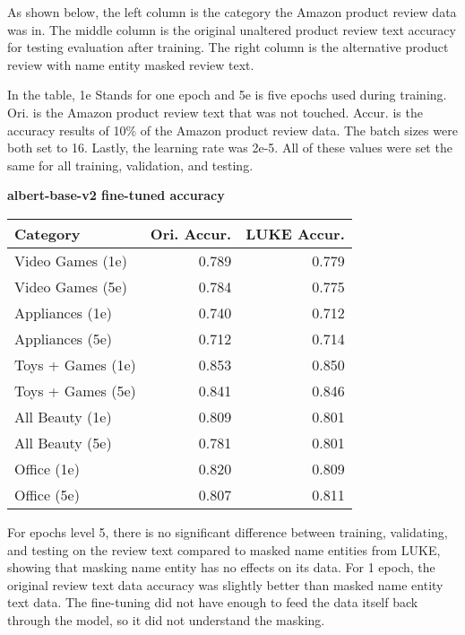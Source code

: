 \documentclass[11pt,a4paper]{article}
\begin{document}
As shown below, the left column is the category the Amazon product review data was in. The middle column is the original unaltered product review text accuracy for testing evaluation after training. The right column is the alternative product review with name entity masked review text.

In the table, 1e Stands for one epoch and 5e is five epochs used during training. Ori. is the Amazon product review text that was not touched. Accur. is the accuracy results of 10\% of the Amazon product review data. The batch sizes were both set to 16. Lastly, the learning rate was 2e-5. All of these values were set the same for all training, validation, and testing. \\

\begin{center}
\textbf{albert-base-v2 fine-tuned accuracy}
\noindent\begin{tabular}{|l|r|r|}
\hline
 Category & Ori. Accur. & LUKE Accur. \\
\hline
Video Games (1e)    & 0.789       & 0.779       \\
Video Games (5e)    & 0.784       & 0.775       \\
Appliances (1e)     & 0.740       & 0.712       \\
Appliances (5e)     & 0.712       & 0.714       \\
Toys + Games (1e)   & 0.853       & 0.850       \\
Toys + Games (5e)   & 0.841       & 0.846       \\
All Beauty (1e)     & 0.809       & 0.801       \\
All Beauty (5e)     & 0.781       & 0.801       \\
Office (1e)         & 0.820       & 0.809       \\
Office (5e)         & 0.807       & 0.811       \\
\hline
\end{tabular}
\end{center}

For epochs level 5, there is no significant difference between training, validating, and testing on the review text compared to masked name entities from LUKE, showing that masking name entity has no effects on its data. For 1 epoch, the original review text data accuracy was slightly better than masked name entity text data. The fine-tuning did not have enough to feed the data itself back through the model, so it did not understand the masking.
\end{document}
